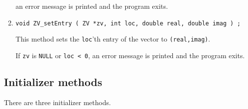 \begin{enumerate}
an error message is printed and the program exits.
\item
\begin{verbatim}
void ZV_setEntry ( ZV *zv, int loc, double real, double imag ) ;
\end{verbatim}
This method sets the {\tt loc}'th entry of the vector 
to {\tt (real,imag)}.
\par {}
If {\tt zv} is {\tt NULL} or {\tt loc < 0},
an error message is printed and the program exits.
\end{enumerate}
\par
\subsection{Initializer methods}
\label{subsection:ZV:proto:initializers}
\par
There are three initializer methods.
\par
